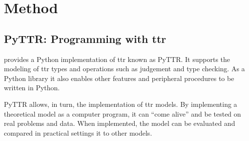 \renewcommand{\sectionautorefname}{Section}
\let\subsectionautorefname\sectionautorefname
\let\subsubsectionautorefname\sectionautorefname
\section{Method}
\label{sec:method}

\subsection{PyTTR: Programming with \gls{ttr}}
\label{sec:pyttr}

\cite{pyttr} provides a Python implementation of \gls{ttr} known as PyTTR.
It supports the modeling of \gls{ttr} types and operations such as judgement and type checking.
As a Python library it also enables other features and peripheral procedures to be written in Python.

PyTTR allows, in turn, the implementation of \gls{ttr} models.
By implementing a theoretical model as a computer program, it can ``come alive'' and be tested on real problems and data.
When implemented, the model can be evaluated and compared in practical settings it to other models.

